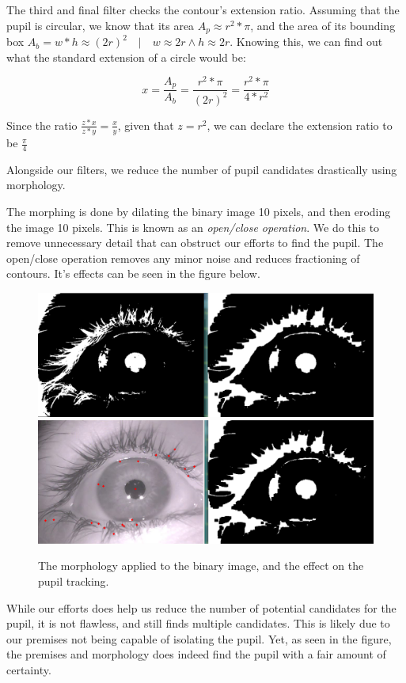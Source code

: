 The third and final filter checks the contour's extension ratio. Assuming that the pupil is circular, we know that its area \(A_p \approx r^2*\pi\), and the area of its bounding box \(A_b = w*h \approx (2r)^2 \quad | \quad w \approx 2r \wedge h \approx 2r\). Knowing this, we can find out what the standard extension of a circle would be:

\[x = \frac{A_p}{A_b} = \frac{r^2*\pi}{(2r)^2} = \frac{r^2*\pi}{4*r^2}\]

Since the ratio \(\frac{z*x}{z*y} = \frac{x}{y}\), given that \(z = r^2\), we can declare the extension ratio to be \(\frac{\pi}{4}\)
\newline

Alongside our filters, we reduce the number of pupil candidates drastically using morphology.\newline

The morphing is done by dilating the binary image 10 pixels, and then eroding the image 10 pixels. This is known as an \emph{open/close operation}. We do this to remove unnecessary detail that can obstruct our efforts to find the pupil. The open/close operation removes any minor noise and reduces fractioning of contours. It's effects can be seen in the figure below.\newline

\begin{figure}[h]
	\centering
	\includegraphics[scale=0.3]{morphology.png}
	\includegraphics[scale=0.3]{morphology_results.png}
	\caption{The morphology applied to the binary image, and the effect on the pupil tracking.}
\end{figure}

While our efforts does help us reduce the number of potential candidates for the pupil, it is not flawless, and still finds multiple candidates. This is likely due to our premises not being capable of isolating the pupil. Yet, as seen in the figure, the premises and morphology does indeed find the pupil with a fair amount of certainty.